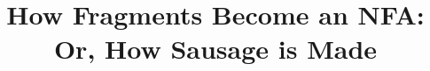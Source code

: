 \documentclass{article}
\begin{document}
\title{How Fragments Become an NFA:\\ Or, How Sausage is Made}
\maketitle
\end{document}
